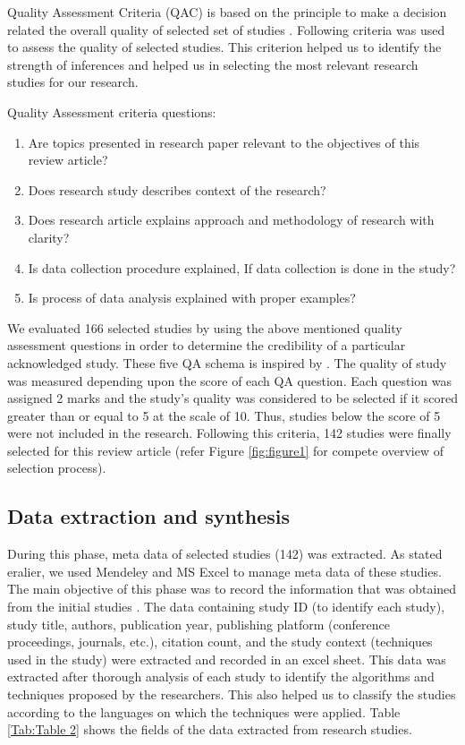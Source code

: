 \documentclass{article}
\begin{document}
Quality Assessment Criteria (QAC) is based on the principle to make a decision related the overall quality of selected set of studies \cite{kitchenham2010systematic}. Following criteria was used to assess the quality of selected studies. This criterion helped us to identify the strength of inferences and helped us in selecting the most relevant research studies for our research.

Quality Assessment criteria questions:

\begin {enumerate}
\item Are topics presented in research paper relevant to the objectives of this review article?
\item Does research study describes context of the research?
\item Does research article explains approach and methodology of research with clarity?
\item Is data collection procedure explained, If data collection is done in the study?
\item Is process of data analysis explained with proper examples?
\end {enumerate}

We evaluated 166 selected studies by using the above mentioned quality assessment questions in order to determine the credibility of a particular acknowledged study. These five QA schema is inspired by \cite{nidhra2013knowledge}.  The quality of study was measured depending upon the score of each QA question. Each question was assigned 2 marks and the study's quality was considered to be selected if it scored greater than or equal to 5 at the scale of 10. Thus, studies below the score of 5 were not included in the research. Following this criteria, 142 studies were finally selected for this review article (refer Figure \ref{fig:figure1} for compete overview of selection process). 





\subsection{Data extraction and synthesis}
During this phase, meta data of selected studies (142) was extracted. As stated eralier, we used Mendeley and MS Excel to manage meta data of these studies. The main objective of this phase was to record the information that was obtained from the initial studies \cite{kitchenham2010systematic}.  The data containing study ID (to identify each study), study title, authors, publication year, publishing platform (conference proceedings, journals, etc.), citation count, and the study context (techniques used in the study) were extracted and recorded in an excel sheet. This data was extracted after thorough analysis of each study to identify the algorithms and techniques proposed by the researchers. This also helped us to classify the studies according to the languages on which the techniques were applied. Table \ref{Tab:Table 2} shows the fields of the data extracted from research studies.
\end{document}
